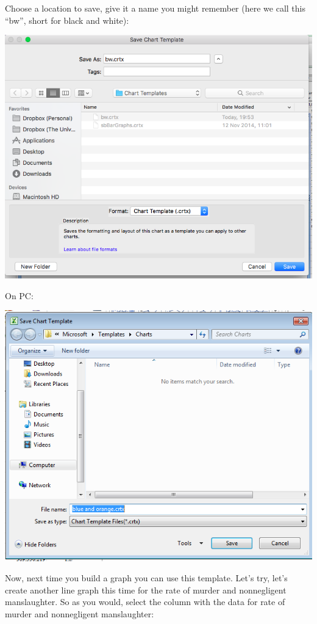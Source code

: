 \documentclass[
]{book}
\begin{document}
Choose a location to save, give it a name you might remember (here we call this ``bw'', short for black and white):

\includegraphics{imgs/name_template.png}

On PC:

\includegraphics{imgs/pc_save_template_3.png}

Now, next time you build a graph you can use this template. Let's try, let's create another line graph this time for the rate of murder and nonnegligent manslaughter. So as you would, select the column with the data for rate of murder and nonnegligent manslaughter:
\end{document}
